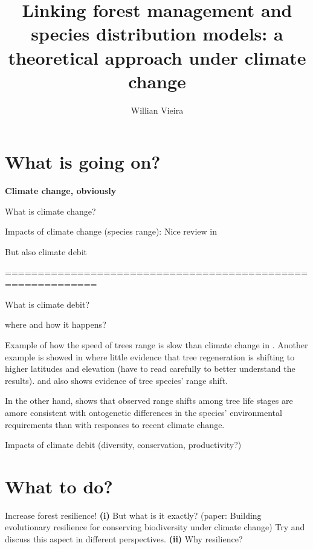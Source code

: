




\title{Linking forest management and species distribution models: a theoretical approach under climate change}

\author{Willian Vieira}

\maketitle

\section{What is going on?}

\textbf{Climate change, obviously}

What is climate change?

Impacts of climate change (species range): Nice review in \cite{Price2013}

But also climate debit

============================================================

What is climate debit?

where and how it happens?

Example of how the speed of trees range is slow than climate change in \cite{Sittaro2017}. Another example is showed in \cite{Serra-Diaz2016} where little evidence that tree regeneration is shifting to higher latitudes and elevation (have to read carefully to better understand the results). \cite{Monleon2015} and \cite{Boisvert-Marsh2014} also shows evidence of tree species' range shift.

In the other hand, \cite{Malis2016} shows that observed range shifts among tree life stages are amore consistent with ontogenetic differences in the species' environmental requirements than with responses to recent climate change.

Impacts of climate debit (diversity, conservation, productivity?)

\section{What to do?}

Increase forest resilience! \textbf{(i)} But what is it exactly? (paper: Building evolutionary resilience for conserving biodiversity under climate change) Try and discuss this aspect in different perspectives. \textbf{(ii)} Why resilience?

